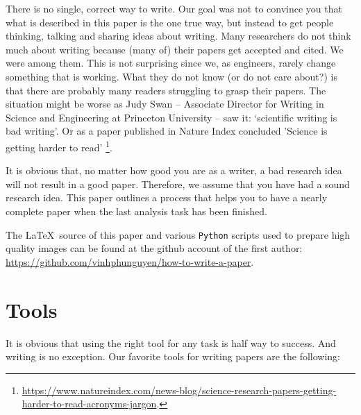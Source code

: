 \documentclass[authoryear,12pta4paper,fleqn]{article}
\numberwithin{equation}{section}
\theoremstyle{remark}
\begin{document}
There is no single, correct way to write.  Our goal was not to convince you that what is described in this paper is the one true way, but instead to get people thinking, talking and sharing ideas about writing. Many researchers do not think much about writing because (many of) their papers get accepted and cited. We were among them. This is not surprising since  we, as engineers, rarely change something that is working. 
What they do not know (or do not care about?) is that there are probably many readers struggling to grasp their papers. The situation might be worse as Judy Swan -- Associate Director for Writing in Science and Engineering at Princeton University -- saw it: `scientific writing is bad writing'. Or as a paper published in Nature Index concluded 'Science is getting harder to read' \footnote{\url{https://www.natureindex.com/news-blog/science-research-papers-getting-harder-to-read-acronyms-jargon}.}.

It is obvious that, no matter how good you are as a writer, a bad research idea will not result in a good paper. Therefore, we  assume that you have had a  sound research idea. This paper outlines a process that helps you to have a nearly complete paper when the last analysis task has been finished.  

The \LaTeX\ source of this paper and various \texttt{Python} scripts used to prepare high quality images can be found at the github account of the first author: \url{https://github.com/vinhphunguyen/how-to-write-a-paper}.


\section{Tools}\label{sec:tools}

It is obvious that using the right tool for any task is half way to success. And writing is no exception. Our favorite tools for writing papers are the following:
\end{document}
